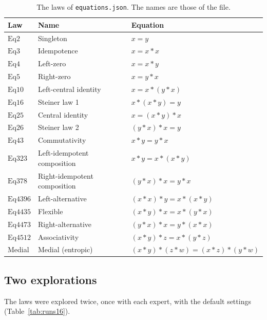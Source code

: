 \documentclass[11pt,a4paper]{article}
\theoremstyle{definition}
\theoremstyle{remark}
\newcommand{\code}[1]{\texttt{#1}}
\newcommand{\Eq}[1]{\mathrm{Eq}#1}
\begin{document}
\begin{table}[ht]
\centering
\small
\begin{tabular}{@{}lll@{}}
\toprule
Law & Name & Equation \\
\midrule
$\Eq{2}$ & Singleton & $x = y$ \\
$\Eq{3}$ & Idempotence & $x = x * x$ \\
$\Eq{4}$ & Left-zero & $x = x * y$ \\
$\Eq{5}$ & Right-zero & $x = y * x$ \\
$\Eq{10}$ & Left-central identity & $x = x * (y * x)$ \\
$\Eq{16}$ & Steiner law 1 & $x * (x * y) = y$ \\
$\Eq{25}$ & Central identity & $x = (x * y) * x$ \\
$\Eq{26}$ & Steiner law 2 & $(y * x) * x = y$ \\
$\Eq{43}$ & Commutativity & $x * y = y * x$ \\
$\Eq{323}$ & Left-idempotent composition & $x * y = x * (x * y)$ \\
$\Eq{378}$ & Right-idempotent composition & $(y * x) * x = y * x$ \\
$\Eq{4396}$ & Left-alternative & $(x * x) * y = x * (x * y)$ \\
$\Eq{4435}$ & Flexible & $(x * y) * x = x * (y * x)$ \\
$\Eq{4473}$ & Right-alternative & $(y * x) * x = y * (x * x)$ \\
$\Eq{4512}$ & Associativity & $(x * y) * z = x * (y * z)$ \\
Medial & Medial (entropic) & $(x * y) * (z * w) = (x * z) * (y * w)$ \\
\bottomrule
\end{tabular}
\caption{The laws of \code{equations.json}. The names are those of the file.}\label{tab:laws16}
\end{table}

\subsection{Two explorations}

The laws were explored twice, once with each expert, with the default settings (Table~\ref{tab:runs16}).
\end{document}
